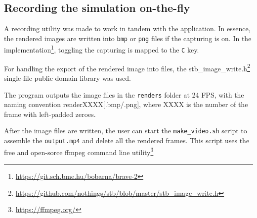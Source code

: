\documentclass[sigplan,screen,nonacm]{acmart}
\begin{document}
\subsection{Recording the simulation on-the-fly}
A recording utility was made to work in tandem with the application. In essence,
the rendered images are written into \texttt{bmp} or \texttt{png} files if the
capturing is on. In the
implementation\footnote{\url{https://git.sch.bme.hu/bobarna/brave-2}}, toggling
the capturing is mapped to the \texttt{C} key.


For handling the export of the rendered image into files, the
stb\_image\_write.h\footnote{\url{https://github.com/nothings/stb/blob/master/stb\_image\_write.h}}
single-file public domain library was used. 


The program outputs the image files in the \texttt{renders} folder at 24 FPS,
with the naming convention renderXXXX[.bmp/.png], where XXXX is the number of
the frame with left-padded zeroes.


After the image files are written, the user can start the
\texttt{make\_video.sh} script to assemble the \texttt{output.mp4} and delete
all the rendered frames. This script uses the free and open-sorce ffmpeg command
line utility\footnote{\url{https://ffmpeg.org/}}
\end{document}
